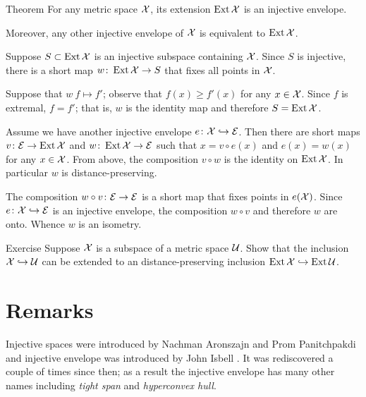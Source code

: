 \begin{thm}{Theorem}\label{thm:inj-envelope}
For any metric space $\mathcal{X}$, its extension $\mathop{\rm Ext}\nolimits\mathcal{X}$ is an injective envelope.

Moreover, any other injective envelope of $\mathcal{X}$ is equivalent to $\mathop{\rm Ext}\nolimits\mathcal{X}$.
\end{thm}

Suppose $S\subset \mathop{\rm Ext}\nolimits\mathcal{X}$ is an injective subspace containing $\mathcal{X}$.
Since $S$ is injective, there is a short map $w\colon\mathop{\rm Ext}\nolimits\mathcal{X}\to S$ that fixes all points in $\mathcal{X}$.

Suppose that $w\:f\mapsto f'$; observe that $f(x)\ge f'(x)$ for any $x\in \mathcal{X}$.
Since $f$ is extremal, $f=f'$;
that is, $w$ is the identity map and therefore $S=\mathop{\rm Ext}\nolimits\mathcal{X}$.

Assume we have another injective envelope $e\colon\mathcal{X}\hookrightarrow \mathcal{E}$.
Then there are short maps $v\colon\mathcal{E}\to \mathop{\rm Ext}\nolimits\mathcal{X}$ and $w\colon\mathop{\rm Ext}\nolimits\mathcal{X}\to \mathcal{E}$ such that $x=v\circ e(x)$ and $e(x)=w(x)$ for any $x\in\mathcal{X}$.
From above, the composition $v\circ w$ is the identity on $\mathop{\rm Ext}\nolimits\mathcal{X}$.
In particular $w$ is distance-preserving.

The composition $w\circ v\colon\mathcal{E}\to \mathcal{E}$ is a short map that fixes points in $e(\mathcal{X})$.
Since $e\colon\mathcal{X}\hookrightarrow \mathcal{E}$ is an injective envelope, the composition $w\circ v$ and therefore $w$ are onto.
Whence $w$ is an isometry.
\qeds

\begin{thm}{Exercise}\label{ex:d-p-inclusion}
Suppose $\mathcal{X}$ is a subspace of a metric space $\mathcal{U}$.
Show that the inclusion $\mathcal{X}\hookrightarrow\mathcal{U}$ can be extended to an distance-preserving inclusion $\mathop{\rm Ext}\nolimits\mathcal{X}\hookrightarrow\mathop{\rm Ext}\nolimits\mathcal{U}$.
\end{thm}


\section{Remarks}

Injective spaces were introduced by Nachman Aronszajn and Prom Panitchpakdi \cite{aronszajn-panitchpakdi} and injective envelope was introduced by John Isbell \cite{isbell}.
It was rediscovered a couple of times since then;
as a result the injective envelope has many other names including \emph{tight span} and \emph{hyperconvex hull}.

